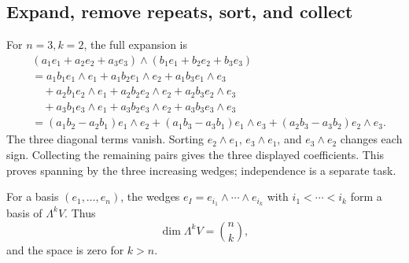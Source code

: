 \subsection{Expand, remove repeats, sort, and collect}
For $n=3,k=2$, the full expansion is
\begin{align*}
&(a_1e_1+a_2e_2+a_3e_3)\wedge(b_1e_1+b_2e_2+b_3e_3)\\
&=a_1b_1e_1\wedge e_1+a_1b_2e_1\wedge e_2+a_1b_3e_1\wedge e_3\\
&\quad+a_2b_1e_2\wedge e_1+a_2b_2e_2\wedge e_2+a_2b_3e_2\wedge e_3\\
&\quad+a_3b_1e_3\wedge e_1+a_3b_2e_3\wedge e_2+a_3b_3e_3\wedge e_3\\
&=(a_1b_2-a_2b_1)e_1\wedge e_2
+(a_1b_3-a_3b_1)e_1\wedge e_3
+(a_2b_3-a_3b_2)e_2\wedge e_3.
\end{align*}
The three diagonal terms vanish. Sorting $e_2\wedge e_1$,
$e_3\wedge e_1$, and $e_3\wedge e_2$ changes each sign. Collecting the
remaining pairs gives the three displayed coefficients. This proves
spanning by the three increasing wedges; independence is a separate task.
\begin{theorem}\label{thm:appendix-exterior-basis}
For a basis $(e_1,\ldots,e_n)$, the wedges
$e_I=e_{i_1}\wedge\cdots\wedge e_{i_k}$ with $i_1<\cdots<i_k$ form
a basis of $\Lambda^kV$. Thus
\[
\dim\Lambda^kV=\binom nk,
\]
 and the space
is zero for $k>n$.
\end{theorem}
